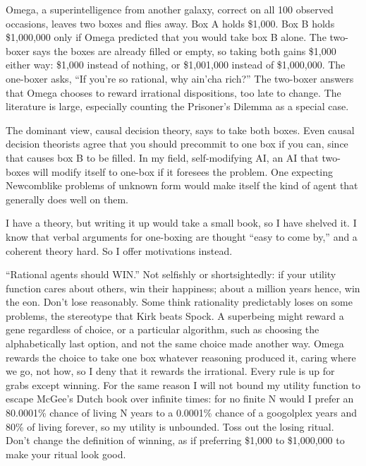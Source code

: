 
Omega, a superintelligence from another galaxy, correct on all 100 observed occasions, leaves two boxes and flies away. Box A holds \$1,000. Box B holds \$1,000,000 only if Omega predicted that you would take box B alone. The two-boxer says the boxes are already filled or empty, so taking both gains \$1,000 either way: \$1,000 instead of nothing, or \$1,001,000 instead of \$1,000,000. The one-boxer asks, ``If you're so rational, why ain'cha rich?'' The two-boxer answers that Omega chooses to reward irrational dispositions, too late to change. The literature is large, especially counting the Prisoner's Dilemma as a special case. 

The dominant view, causal decision theory, says to take both boxes.  Even causal decision theorists agree that you should precommit to one box if you can, since that causes box B to be filled. In my field, self-modifying AI, an AI that two-boxes will modify itself to one-box if it foresees the problem. One expecting Newcomblike problems of unknown form would make itself the kind of agent that generally does well on them.

I have a theory, but writing it up would take a small book, so I have shelved it. I know that verbal arguments for one-boxing are thought ``easy to come by,'' and a coherent theory hard. So I offer motivations instead. 

``Rational agents should WIN.'' Not selfishly or shortsightedly: if your utility function cares about others, win their happiness; about a million years hence, win the eon. Don't lose reasonably. Some think rationality predictably loses on some problems, the stereotype that Kirk beats Spock. A superbeing might reward a gene regardless of choice, or a particular algorithm, such as choosing the alphabetically last option, and not the same choice made another way. Omega rewards the choice to take one box whatever reasoning produced it, caring where we go, not how, so I deny that it rewards the irrational.  Every rule is up for grabs except winning. For the same reason I will not bound my utility function to escape McGee's Dutch book over infinite times: for no finite N would I prefer an 80.0001\% chance of living N years to a 0.0001\% chance of a googolplex years and 80\% of living forever, so my utility is unbounded. Toss out the losing ritual. Don't change the definition of winning, as if preferring \$1,000 to \$1,000,000 to make your ritual look good.

